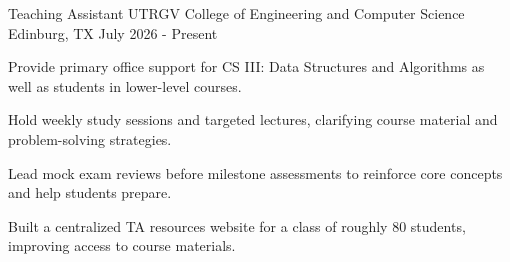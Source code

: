 \begin{cventries}
  \cventry
    {Teaching Assistant} %
    {UTRGV College of Engineering and Computer Science} %
    {Edinburg, TX} %
    {July 2026 - Present} %
    {
      \begin{cvitems}
        \item {Provide primary office support for CS III: Data Structures and Algorithms as well as students in lower-level courses.}
        \item {Hold weekly study sessions and targeted lectures, clarifying course material and problem-solving strategies.}
        \item {Lead mock exam reviews before milestone assessments to reinforce core concepts and help students prepare.}
        \item {Built a centralized TA resources website for a class of roughly 80 students, improving access to course materials.}
      \end{cvitems}
    }


\end{cventries}
